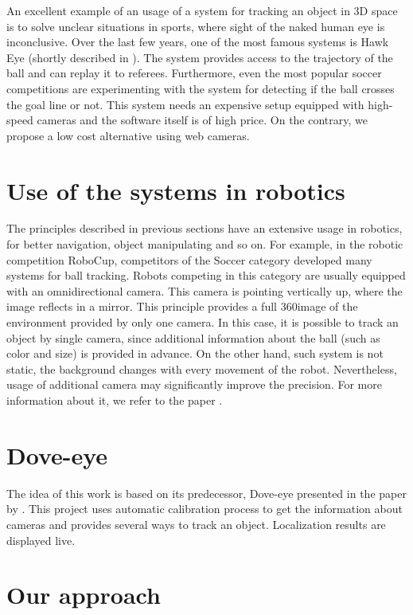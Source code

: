 An excellent example of an usage of a system for tracking an object in 3D space
is to solve unclear situations in sports, where sight of the naked human
eye is inconclusive. Over the last few years, one of the most famous systems is
Hawk Eye (shortly described in \citet*{owens2003hawk}). The system provides
access to the trajectory of the ball and can replay it to referees.
Furthermore, even the most popular soccer competitions are experimenting with
the system for detecting if the ball crosses the goal line or not.  This system needs
an expensive setup equipped with high-speed cameras and the software itself is of
high price. On the contrary, we propose a low cost alternative using web cameras.

\section{Use of the systems in robotics}

The principles described in previous sections have an extensive usage in
robotics, for better navigation, object manipulating and so on. For example, in
the robotic competition RoboCup, competitors of the Soccer category developed
many systems for ball tracking. Robots competing in this category are usually
equipped with an omnidirectional camera.  This camera is pointing vertically
up, where the image reflects in a mirror.  This principle provides a full
360\degree image of the environment provided by only one camera. In this case,
it is possible to track an object by single camera, since additional
information about the ball (such as color and size) is provided in advance. On
the other hand, such system is not static, the background changes with every
movement of the robot. Nevertheless, usage of additional camera may
significantly improve the precision. For more information about it, we refer to
the paper \citet*{kappeler20103d}.


\section{Dove-eye}

The idea of this work is based on its predecessor, Dove-eye presented in the
paper by \citet*{dove-eye}. This project uses automatic calibration process to
get the information about cameras and provides several ways to track an
object. Localization results are displayed live.

\section{Our approach}

